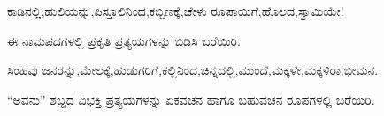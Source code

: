 \noindent\hspace*{1.8em}ಕಾಡಿನಲ್ಲಿ,\hspace{0.9em}ಹುಲಿಯನ್ನು,\hspace{0.9em}ಪಿಸ್ತೂಲಿನಿಂದ,\hspace{0.9em}ಕಬ್ಬಿಣಕ್ಕೆ,\hspace{0.9em}ಚೇಳು ರೂಪಾಯಿಗೆ,\hspace{0.9em}ಹೊಲದ,\hspace{0.9em}ಸ್ವಾಮಿಯೇ!\par\vspace{3pt plus 2pt}

\vspace{2.5pt plus 3pt minus 0.5pt}\noindent\hspace*{1.2em}\hspace{0.55em}ಈ ನಾಮಪದಗಳಲ್ಲಿ ಪ್ರಕೃತಿ ಪ್ರತ್ಯಯಗಳನ್ನು ಬಿಡಿಸಿ ಬರೆಯಿರಿ.\par

\noindent\hspace*{1.8em}ಸಿಂಹವು ಜನರನ್ನು,\hspace{0.9em}ಮೇಲಕ್ಕೆ,\hspace{0.9em}ಹುಡುಗರಿಗೆ,\hspace{0.9em}ಕಲ್ಲಿನಿಂದ,\hspace{0.9em}ಚಿನ್ನದಲ್ಲಿ,\hspace{0.9em}ಮುಂದೆ,\hspace{0.9em}ಮಕ್ಕಳೇ,\hspace{0.9em}ಮಕ್ಕಳಿರಾ,\hspace{0.9em}ಭೀಮನ.\par\vspace{3pt plus 2pt}

\vspace{2.5pt plus 3pt minus 0.5pt}\noindent\hspace*{1.2em}\hspace{0.55em}“ಅವನು” ಶಬ್ದದ ವಿಭಕ್ತಿ ಪ್ರತ್ಯಯಗಳನ್ನು ಏಕವಚನ ಹಾಗೂ ಬಹುವಚನ ರೂಪಗಳಲ್ಲಿ ಬರೆಯಿರಿ.\par
